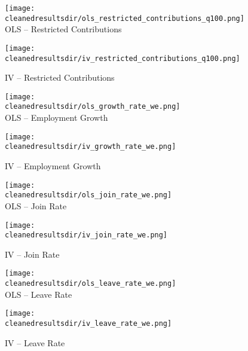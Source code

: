 \documentclass{article}
\newcommand{\cleanedresultsdir}{../results/cleaned}
\begin{document}
\clearpage

\begin{figure}[H]
  \centering
  \texttt{[image: \\cleanedresultsdir/ols\_restricted\_contributions\_q100.png]}\\[2pt]
  \caption*{OLS – Restricted Contributions}
  \texttt{[image: \\cleanedresultsdir/iv\_restricted\_contributions\_q100.png]}\\[2pt]
  \caption*{IV – Restricted Contributions}
\end{figure}

\clearpage


\begin{figure}[H]
  \centering
  \texttt{[image: \\cleanedresultsdir/ols\_growth\_rate\_we.png]}\\[2pt]
  \caption*{OLS – Employment Growth}
  \texttt{[image: \\cleanedresultsdir/iv\_growth\_rate\_we.png]}\\[2pt]
  \caption*{IV – Employment Growth}
\end{figure}

\clearpage

\begin{figure}[H]
  \centering
  \texttt{[image: \\cleanedresultsdir/ols\_join\_rate\_we.png]}\\[2pt]
  \caption*{OLS – Join Rate}
  \texttt{[image: \\cleanedresultsdir/iv\_join\_rate\_we.png]}\\[2pt]
  \caption*{IV – Join Rate}
\end{figure}

\clearpage

\begin{figure}[H]
  \centering
  \texttt{[image: \\cleanedresultsdir/ols\_leave\_rate\_we.png]}\\[2pt]
  \caption*{OLS – Leave Rate}
  \texttt{[image: \\cleanedresultsdir/iv\_leave\_rate\_we.png]}\\[2pt]
  \caption*{IV – Leave Rate}
\end{figure}
\end{document}
